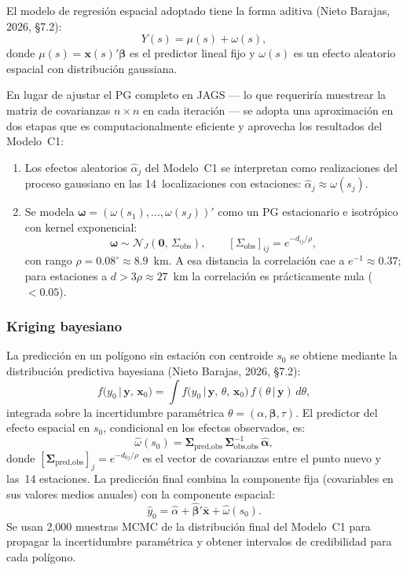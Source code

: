 \documentclass[12pt]{article}
\begin{document}
El modelo de regresi\'on espacial adoptado tiene la forma aditiva
(Nieto Barajas, 2026, \S7.2):
\[
  Y(s) = \mu(s) + \omega(s),
\]
donde $\mu(s) = \mathbf{x}(s)'\boldsymbol{\beta}$ es el predictor lineal
fijo y $\omega(s)$ es un efecto aleatorio espacial con distribuci\'on
gaussiana.

En lugar de ajustar el PG completo en JAGS --- lo que requerir\'ia
muestrear la matriz de covarianzas $n \times n$ en cada iteraci\'on ---
se adopta una aproximaci\'on en dos etapas que es computacionalmente
eficiente y aprovecha los resultados del Modelo~C1:

\begin{enumerate}
  \item Los efectos aleatorios $\hat\alpha_j$ del Modelo~C1 se interpretan
        como realizaciones del proceso gaussiano en las 14~localizaciones
        con estaciones: $\hat\alpha_j \approx \omega(s_j)$.
  \item Se modela $\boldsymbol{\omega} = (\omega(s_1),\ldots,\omega(s_J))'$
        como un PG estacionario e isotr\'opico con kernel exponencial:
        \[
          \boldsymbol{\omega} \sim \mathcal{N}_J(\mathbf{0},\,\Sigma_{\text{obs}}), \qquad
          [\Sigma_{\text{obs}}]_{ij} = e^{-d_{ij}/\rho},
        \]
        con rango $\rho = 0.08^\circ \approx 8.9$~km.
        A esa distancia la correlaci\'on cae a $e^{-1} \approx 0.37$;
        para estaciones a $d > 3\rho \approx 27$~km la correlaci\'on
        es pr\'acticamente nula ($< 0.05$).
\end{enumerate}

\subsubsection*{Kriging bayesiano}

La predicci\'on en un pol\'igono sin estaci\'on con centroide $s_0$ se
obtiene mediante la distribuci\'on predictiva bayesiana (Nieto Barajas,
2026, \S7.2):
\[
  f\!\bigl(y_0 \,\big|\, \mathbf{y},\, \mathbf{x}_0\bigr)
  = \int f\!\bigl(y_0 \,\big|\, \mathbf{y},\, \theta,\, \mathbf{x}_0\bigr)\,
          f(\theta \,|\, \mathbf{y})\, d\theta,
\]
integrada sobre la incertidumbre param\'etrica $\theta = (\alpha, \boldsymbol{\beta}, \tau)$.
El predictor del efecto espacial en $s_0$, condicional en los efectos
observados, es:
\[
  \hat\omega(s_0) = \boldsymbol{\Sigma}_{\text{pred,obs}}\,
                   \boldsymbol{\Sigma}_{\text{obs,obs}}^{-1}\,
                   \hat{\boldsymbol{\alpha}},
\]
donde $[\boldsymbol{\Sigma}_{\text{pred,obs}}]_j = e^{-d_{0j}/\rho}$
es el vector de covarianzas entre el punto nuevo y las~14 estaciones.
La predicci\'on final combina la componente fija (covariables en sus
valores medios anuales) con la componente espacial:
\[
  \hat y_0 = \hat\alpha + \hat{\boldsymbol\beta}'\bar{\mathbf{x}} + \hat\omega(s_0).
\]
Se usan 2{,}000 muestras MCMC de la distribuci\'on final del Modelo~C1
para propagar la incertidumbre param\'etrica y obtener intervalos de
credibilidad para cada pol\'igono.
\end{document}
